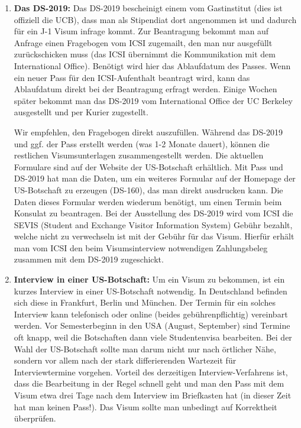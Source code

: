 \documentclass[a4paper]{scrreprt}
\begin{document}
\begin{enumerate}
	\item \textbf{Das DS-2019:} Das DS-2019 bescheinigt einem vom Gastinstitut (dies ist offiziell die UCB), dass man als Stipendiat dort angenommen ist und dadurch für ein J-1 Visum infrage kommt. Zur Beantragung bekommt man auf Anfrage einen Fragebogen vom ICSI zugemailt, den man nur ausgefüllt zurückschicken muss (das ICSI übernimmt die Kommunikation mit dem International Office). Benötigt wird hier das Ablaufdatum des Passes. Wenn ein neuer Pass für den ICSI-Aufenthalt beantragt wird, kann das Ablaufdatum direkt bei der Beantragung erfragt werden. Einige Wochen später bekommt man das DS-2019 vom International Office der UC Berkeley ausgestellt und per Kurier zugestellt.
	
	Wir empfehlen, den Fragebogen direkt auszufüllen. Während das DS-2019 und ggf. der Pass erstellt werden (was 1-2 Monate dauert), können die restlichen Visumsunterlagen zusammengestellt werden. Die aktuellen Formulare sind auf der Website der US-Botschaft erhältlich. Mit Pass und DS-2019 hat man die Daten, um ein weiteres Formular auf der Homepage der US-Botschaft zu erzeugen (DS-160), das man direkt ausdrucken kann. Die Daten dieses Formular werden wiederum benötigt, um einen Termin beim Konsulat zu beantragen. Bei der Ausstellung des DS-2019 wird vom ICSI die SEVIS (Student and Exchange Visitor Information System) Gebühr bezahlt, welche nicht zu verwechseln ist mit der Geb\"uhr f\"ur das Visum. Hierfür erhält man vom ICSI den beim Visumsinterview notwendigen Zahlungsbeleg zusammen mit dem DS-2019 zugeschickt.

	\item \textbf{Interview in einer US-Botschaft:} Um ein Visum zu bekommen, ist ein kurzes Interview in einer US-Botschaft notwendig. In Deutschland befinden sich diese in Frankfurt, Berlin und München. Der Termin für ein solches Interview kann telefonisch oder online (beides gebührenpflichtig) vereinbart werden. Vor Semesterbeginn in den USA (August, September) sind Termine oft knapp, weil die Botschaften dann viele Studentenvisa bearbeiten. Bei der Wahl der US-Botschaft sollte man darum nicht nur nach örtlicher Nähe, sondern vor allem nach der stark differierenden Wartezeit für Interviewtermine vorgehen. Vorteil des derzeitigen Interview-Verfahrens ist, dass die Bearbeitung in der Regel schnell geht und man den Pass mit dem Visum etwa drei Tage nach dem Interview im Briefkasten hat (in dieser Zeit hat man keinen Pass!). Das Visum sollte man unbedingt auf Korrektheit überprüfen.
	

\end{enumerate}
\end{document}
